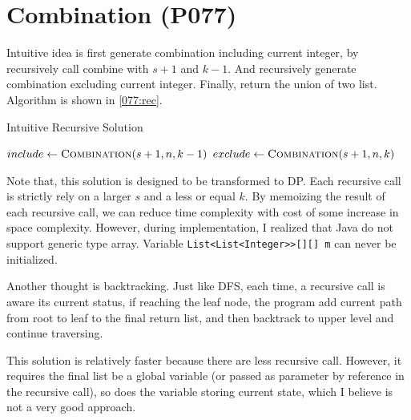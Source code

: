 \documentclass[varwidth]{standalone}
\begin{document}
\section{Combination (P077)}

Intuitive idea is first generate combination including current integer, by
recursively call combine with $s+1$ and $k-1$. And recursively generate
combination excluding current integer. Finally, return the union of two list.
Algorithm is shown in \cref{077:rec}.

\begin{algorithm}[H]
    \caption{Intuitive Recursive Solution}\label{077:rec}
    \begin{algorithmic}[1]
                \State{}
            \EndIf
            \State $include \leftarrow \textsc{Combination} (s+1,n,k-1)$
            \State {}
            \State $exclude \leftarrow \textsc{Combination} (s+1,n,k)$
            \State{}
        \EndProcedure
    \end{algorithmic}
\end{algorithm}

Note that, this solution is designed to be transformed to DP. Each recursive
call is strictly rely on a larger $s$ and a less or equal $k$. By memoizing the
result of each recursive call, we can reduce time complexity with cost of some
increase in space complexity. However, during implementation, I realized that
Java do not support generic type array. Variable
\texttt{List<List<Integer>>[][] m} can never be initialized.

Another thought is backtracking. Just like DFS, each time, a recursive call is
aware its current status, if reaching the leaf node, the program add current
path from root to leaf to the final return list, and then backtrack to upper
level and continue traversing.

This solution is relatively faster because there are less recursive call.
However, it requires the final list be a global variable (or passed as
parameter by reference in the recursive call), so does the variable storing 
current state, which I believe is not a very good approach.
\end{document}
